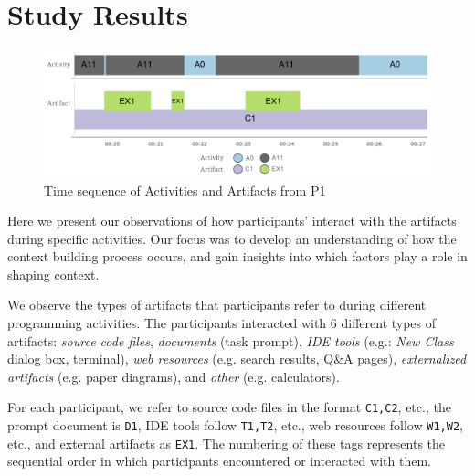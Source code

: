 
\section{Study Results}



\begin{figure}
\includegraphics[width=\columnwidth]{figures/P1timeplot}
\caption{Time sequence of Activities and Artifacts from P1}
\label{P1Fig}
\end{figure}

Here we present our observations of how participants' interact with the artifacts during specific activities. Our focus was to develop an understanding of how the context building process occurs, and gain insights into which factors play a role in shaping context.

We observe the types of artifacts that participants refer to during different programming activities. The participants interacted with 6 different types of artifacts: \textit{source code files}, \textit{documents} (task prompt), \textit{IDE tools} (e.g.: \textit{New Class} dialog box, terminal), \textit{web resources} (e.g. search results, Q\&A pages), \textit{externalized artifacts} (e.g. paper diagrams), and \textit{other} (e.g. calculators).

For each participant, we refer to source code files in the format \texttt{C1,C2}, etc., the prompt document is \texttt{D1}, IDE tools follow \texttt{T1,T2}, etc., web resources follow \texttt{W1,W2}, etc., and external artifacts as \texttt{EX1}. The numbering of these tags represents the sequential order in which participants encountered or interacted with them.


